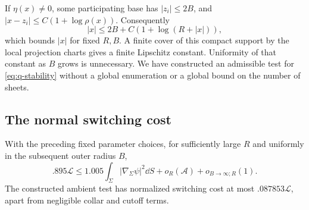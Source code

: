 If $\eta(x)\ne0$, some participating base has $|z_i|\le2B$, and
$|x-z_i|\le C(1+\log\rho(x))$. Consequently
\[
 |x|\le2B+C(1+\log(R+|x|)),
\]
which bounds $|x|$ for fixed $R,B$. A finite cover of this compact support by the local projection charts gives a finite Lipschitz constant. Uniformity of that constant as $B$ grows is unnecessary. We have constructed an admissible test for \eqref{eq:q-stability} without a global enumeration or a global bound on the number of sheets.



\subsection{The normal switching cost}

\begin{lemma}\label{lem:radial-switch-cost}
With the preceding fixed parameter choices, for sufficiently large $R$
and uniformly in the subsequent outer radius $B$,
\begin{equation}\label{eq:R7}
 .895\mathcal L\le1.005\int_\Sigma|\nabla_\Sigma\psi|^2\dd S
                  +o_R(\mathcal A)+o_{B\to\infty;R}(1).
\end{equation}
The constructed ambient test has normalized switching cost at most
$.087853\mathcal L$, apart from negligible collar and cutoff terms.
\end{lemma}


